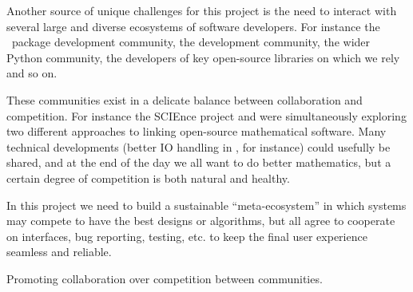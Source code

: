 Another source of unique challenges for this project is the need to
interact with several large and diverse ecosystems of software
developers. For instance the \GAP\ package development community, the
\Sage development community, the wider Python community, the developers
of key open-source libraries on which we rely and so on.

These communities exist in a delicate balance between collaboration
and competition. For instance the SCIEnce project and \Sage were
simultaneously exploring two different approaches to linking
open-source mathematical software. Many technical developments (better
IO handling in \GAP, for instance) could usefully be shared, and at
the end of the day we all want to do better mathematics, but a certain
degree of competition is both natural and healthy.

In this project we need to build a sustainable ``meta-ecosystem'' in
which systems may compete to have the best designs or algorithms, but
all agree to cooperate on interfaces, bug reporting, testing, etc. to
keep the final user experience seamless and reliable.


Promoting collaboration over competition between communities.

